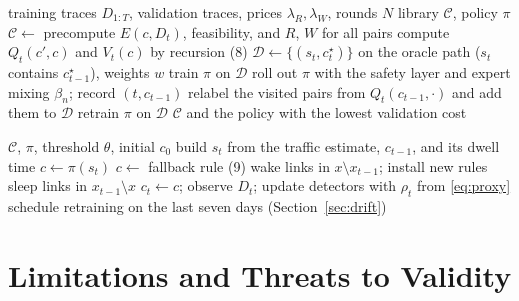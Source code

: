 \documentclass[preprint,12pt]{elsarticle}
\begin{document}
\begin{algorithm}[h!]
\caption{LiRA Offline Training}
\label{alg:offline}
\footnotesize
\begin{algorithmic}[1]
\Require training traces $D_{1:T}$, validation traces, prices $\lambda_R,\lambda_W$, rounds $N$
\Ensure library $\mathcal{C}$, policy $\pi$
\State $\mathcal{C}\gets$  
\State precompute $E(c,D_t)$, feasibility, and $R$, $W$ for all pairs
\State compute $Q_t(c',c)$ and $V_t(c)$ by recursion (8)
\State $\mathcal{D}\gets\{(s_t,c^\star_t)\}$ on the oracle path ($s_t$ contains $c^\star_{t-1}$), weights $w$
\State train $\pi$ on $\mathcal{D}$
\State roll out $\pi$ with the safety layer and expert mixing $\beta_n$; record $(t,c_{t-1})$
\State relabel the visited pairs from $Q_t(c_{t-1},\cdot)$ and add them to $\mathcal{D}$
\State retrain $\pi$ on $\mathcal{D}$
\EndFor
\State \Return $\mathcal{C}$ and the policy with the lowest validation cost
\end{algorithmic}
\end{algorithm}


\begin{algorithm}[h!]
\caption{LiRA Online Control Loop}
\label{alg:online}
\footnotesize
\begin{algorithmic}[1]
\Require $\mathcal{C}$, $\pi$, threshold $\theta$, initial $c_0$
\State build $s_t$ from the traffic estimate, $c_{t-1}$, and its dwell time
\State $c\gets\pi(s_t)$
\State $c\gets$ fallback rule (9)
\EndIf
{}
\State wake links in $x\setminus x_{t-1}$; install new rules
\State sleep links in $x_{t-1}\setminus x$
\EndIf
\State $c_t\gets c$; observe $D_t$; update detectors with $\rho_t$ from \eqref{eq:proxy}
\State schedule retraining on the last seven days (Section~\ref{sec:drift})
\EndIf
\EndFor
\end{algorithmic}
\end{algorithm}


\section{Limitations and Threats to Validity}\label{sec:limitations-full}
\end{document}
